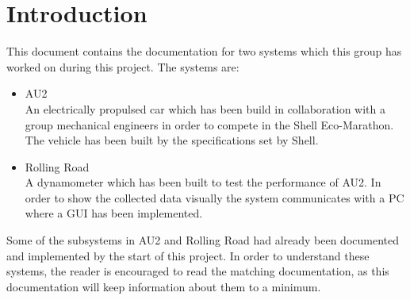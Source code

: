 \chapter{Introduction}
This document contains the documentation for two systems which this group has worked on during this project. The systems are:
\begin{itemize}
	\item{AU2}\\
		An electrically propulsed car which has been build in collaboration with a group mechanical engineers in order to compete in the Shell Eco-Marathon. The vehicle has been built by the specifications set by Shell.
	\item{Rolling Road}\\
		A dynamometer which has been built to test the performance of AU2. In order to show the collected data visually the system communicates with a PC where a GUI has been implemented.
\end{itemize}

Some of the subsystems in AU2 and Rolling Road had already been documented and implemented by the start of this project. In order to understand these systems, the reader is encouraged to read the matching documentation, as this documentation will keep information about them to a minimum.